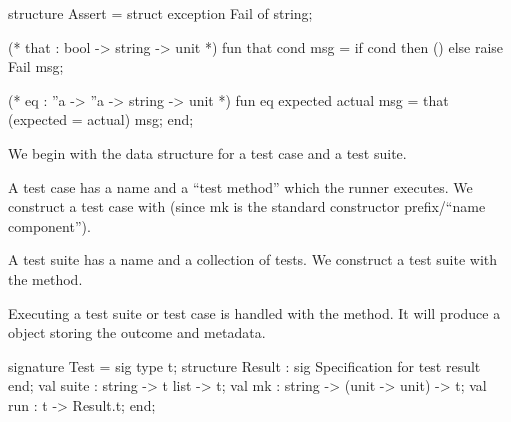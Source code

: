 \nwenddocs{}\endmoddef\nwstartdeflinemarkup\nwenddeflinemarkup
structure Assert = struct
exception Fail of string;

(* that : bool -> string -> unit *)
fun that cond msg =
  if cond then ()
  else raise Fail msg;

(* eq : ''a -> ''a -> string -> unit *)
fun eq expected actual msg =
  that (expected = actual) msg;
end;
\eatline
{}\nwendcode{}\nwdocspar
\begin{node}[Test]
We begin with the data structure for a test case and a test suite.

A test case has a name and a ``test method'' which the runner
executes. We construct a test case with {\Tt{}\nwendquote} (since {\Tt{}mk\nwendquote} is
the standard constructor prefix/``name component'').

A test suite has a name and a collection of tests. We construct a test
suite with the {\Tt{}\nwendquote} method.

Executing a test suite or test case is handled with the {\Tt{}\nwendquote}
method. It will produce a {\Tt{}\nwendquote} object storing the outcome
and metadata.
\end{node}

\nwenddocs{}\endmoddef\nwstartdeflinemarkup\nwenddeflinemarkup
signature Test = sig
  type t;
  structure Result : sig
              \LA{}Specification for test result~{\nwtagstyle{}}\RA{}
            end;
  val suite : string -> t list -> t;
  val mk : string -> (unit -> unit) -> t;
  val run : t -> Result.t;
end;
\nwendcode{}\nwdocspar


